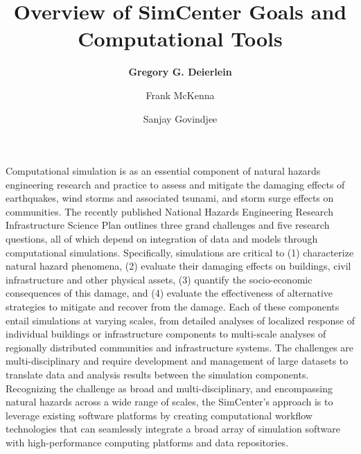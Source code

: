 %
%
%

\title{Overview of SimCenter Goals and Computational Tools}
\author{
    \textbf{Gregory G. Deierlein}
    \and Frank McKenna
    \and Sanjay Govindjee}
\tocauthor{}
%
%
\maketitle
\label{chapter:intro}

Computational simulation is as an essential component of natural hazards engineering research and practice to assess and mitigate the damaging effects of earthquakes, wind storms and associated tsunami, and storm surge effects on communities. The recently published National Hazards Engineering Research Infrastructure Science Plan \citep{edge2020natural} outlines three grand challenges and five research questions, all of which depend on integration of data and models through computational simulations.  Specifically, simulations are critical to (1) characterize natural hazard phenomena, (2) evaluate their damaging effects on buildings, civil infrastructure and other physical assets, (3) quantify the socio-economic consequences of this damage, and (4) evaluate the effectiveness of alternative strategies to mitigate and recover from the damage.  Each of these components entail simulations at varying scales, from detailed analyses of localized response of individual buildings or infrastructure components to multi-scale analyses of regionally distributed communities and infrastructure systems.  The challenges are multi-disciplinary and require development and management of large datasets to translate data and analysis results between the simulation components. Recognizing the challenge as broad and multi-disciplinary, and encompassing natural hazards across a wide range of scales, the SimCenter’s approach is to leverage existing software platforms by creating computational workflow technologies that can seamlessly integrate a broad array of simulation software with high-performance computing platforms and data repositories. 

